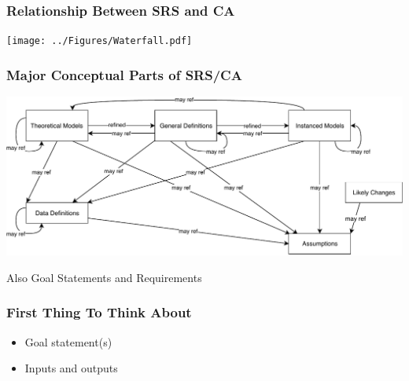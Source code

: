 \documentclass[t,12pt,numbers,fleqn]{beamer}
\begin{document}

\begin{frame}
\frametitle{Relationship Between SRS and CA}
\begin{center}
 \texttt{[image: ../Figures/Waterfall.pdf]}
\end{center}
\end{frame}


\begin{frame}
\frametitle{Major Conceptual Parts of SRS/CA}
\begin{center}
 \includegraphics[width=1.07\textwidth]{../Figures/RelationsBetweenTM_GD_IM_DD_A.pdf}
\end{center}
Also Goal Statements and Requirements
\end{frame}


\begin{frame}
\frametitle{First Thing To Think About}

\begin{itemize}
\item Goal statement(s)
\item Inputs and outputs
\end{itemize}

\end{frame}

\end{document}
